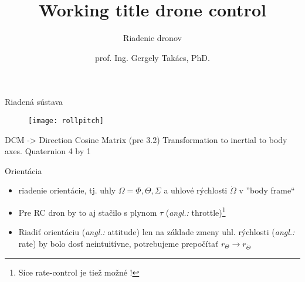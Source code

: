 \documentclass{beamer}
\title[Riadiace Algoritmy Dronov]
{Working title drone control}
\subtitle{\vspace{1em}Riadenie dronov}
\author[]{prof. Ing. Gergely Takács, PhD.}
\date[07.12.2021]{}
\newcommand{\angl}[1]{{\color{gray}(\emph{angl.:} #1)}}
\begin{document}



%

\begin{frame}{Riadená sústava}
\begin{figure}
\centering
  \texttt{[image: rollpitch]}\\
\end{figure}
\end{frame}



%


\begin{frame}
DCM -> Direction Cosine Matrix (pre 3.2)
Transformation to inertial to body axes.
Quaternion 4 by 1
\end{frame}


\begin{frame}[t]{Orientácia}
\begin{itemize}
  \item<1-> riadenie orientácie, tj. uhly $\Omega={\Phi, \Theta, \Sigma}$ a uhlové rýchlosti $\dot\Omega$ v ''body frame``
  \item<2-> Pre RC dron by to aj stačilo s plynom $\tau$ \angl{throttle}\footnote{Síce rate-control je tiež možné \citep{Boland2015}!} \citep{Boland2015}
  \item<3-> Riadiť orientáciu \angl{attitude} len na základe zmeny uhl. rýchlosti \angl{rate} by bolo dosť neintuitívne, potrebujeme prepočítať $r_{\Theta} \rightarrow r_{\dot{\Theta}}$
\end{itemize}
\end{frame}
\end{document}
